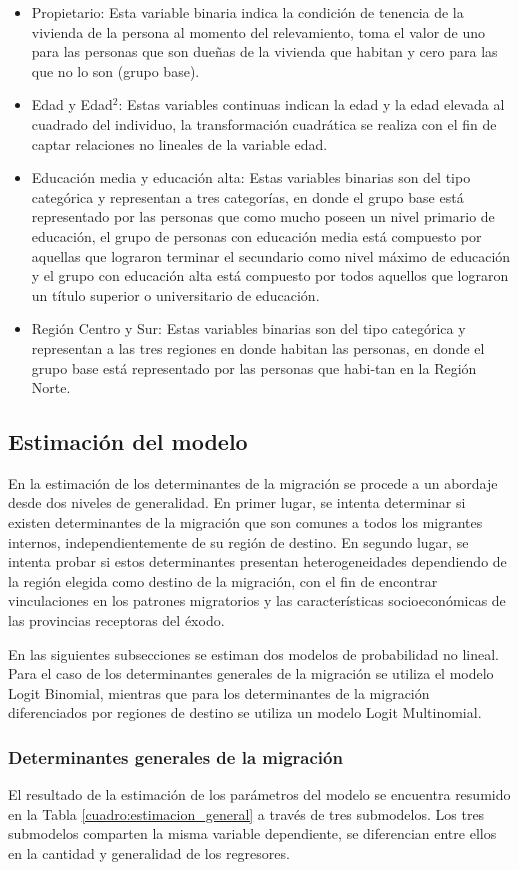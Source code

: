 \documentclass[12pt,a4paper]{article}
\begin{document}
\begin{itemize}
\item Propietario: Esta variable binaria indica la condición de tenencia de la vivienda de la persona al momento del relevamiento, toma el valor de uno para las personas que son dueñas de la vivienda que habitan y cero para las que no lo son (grupo base).
\item Edad y Edad$^{2}$: Estas variables continuas indican la edad  y la edad elevada al cuadrado del individuo, la transformación cuadrática se realiza con el fin de captar relaciones no lineales de la variable edad. 
\item Educación media y educación alta: Estas variables binarias son del tipo categórica y representan a tres categorías, en donde el grupo base está representado por las personas que como mucho poseen un nivel primario de educación, el grupo de personas con educación media está compuesto por aquellas que lograron terminar el secundario como nivel máximo de educación y el grupo con educación alta está compuesto por todos aquellos que lograron un título superior o universitario de educación.
\item Región Centro y Sur: Estas variables binarias son del tipo categórica y representan a las tres regiones en donde habitan las personas, en donde el grupo base está representado por las personas que habi-tan en la Región Norte.
\end{itemize}

\subsection{Estimación del modelo}
En la estimación de los determinantes de la migración se procede a un abordaje desde dos niveles de generalidad. En primer lugar, se intenta determinar si existen determinantes de la migración que son comunes a todos los migrantes internos, independientemente de su región de destino. En segundo lugar, se intenta probar si estos determinantes presentan heterogeneidades dependiendo de la región elegida como destino de la migración, con el fin de encontrar vinculaciones en los patrones migratorios y las características socioeconómicas de las provincias receptoras del éxodo.

En las siguientes subsecciones se estiman dos modelos de probabilidad no lineal. Para el caso de los determinantes generales de la migración se utiliza el modelo Logit Binomial, mientras que para los determinantes de la migración diferenciados por regiones de destino se utiliza un modelo Logit Multinomial.
\subsubsection{Determinantes generales de la migración}
El resultado de la estimación de los parámetros del modelo se encuentra resumido en la Tabla \ref{cuadro:estimacion_general} a través de tres submodelos.
Los tres submodelos comparten la misma variable dependiente, se diferencian entre ellos en la cantidad y generalidad de los regresores.
\end{document}
